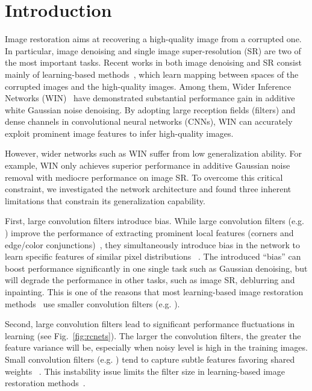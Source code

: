\documentclass[10pt,twocolumn,letterpaper]{article}
\begin{document}
\section{Introduction} \label{intro}
Image restoration aims at recovering a high-quality image from a corrupted one. In particular, image denoising and single image super-resolution (SR) are two of the most important tasks. Recent works in both image denoising and SR consist mainly of learning-based methods~\cite{dong2014learning,kim2016accurate,zhang2016beyond,mao2016image,DBLP:journals/corr/LiuF17}, which learn mapping between spaces of the corrupted images and the high-quality images. Among them, Wider Inference Networks (WIN)~\cite{DBLP:journals/corr/LiuF17} have demonstrated substantial performance gain in additive white Gaussian noise denoising. By adopting large reception fields (filters) and dense channels in convolutional neural networks (CNNs), WIN can accurately exploit prominent image features to infer high-quality images.

However, wider networks such as WIN suffer from low generalization ability. For example, WIN only achieves superior performance in additive Gaussian noise removal with mediocre performance on image SR. To overcome this critical constraint, we investigated the network architecture and found three inherent limitations that constrain its generalization capability. 


First, large convolution filters introduce bias. While large convolution filters (e.g. ) improve the performance of extracting prominent local features (corners and edge/color conjunctions)~\cite{zeiler2014visualizing}, they simultaneously introduce bias in the network to learn specific features of similar pixel distributions ~\cite{DBLP:journals/corr/LiuF17}. The introduced ``bias'' can boost performance significantly in one single task such as Gaussian denoising, but will degrade the performance in other tasks, such as image SR, deblurring and inpainting. This is one of the reasons that most learning-based image restoration methods~\cite{kim2016accurate,zhang2016beyond,mao2016image} use smaller convolution filters (e.g. ).

Second, large convolution filters lead to significant performance fluctuations in learning (see Fig.~\ref{fig:rcnets}). The larger the convolution filters, the greater the feature variance will be, especially when noisy level is high in the training images. Small convolution filters (e.g. ) tend to capture subtle features favoring shared weights ~\cite{szegedy2015going}. This instability issue limits the filter size in learning-based image restoration methods~\cite{mao2016image}. 
\end{document}
